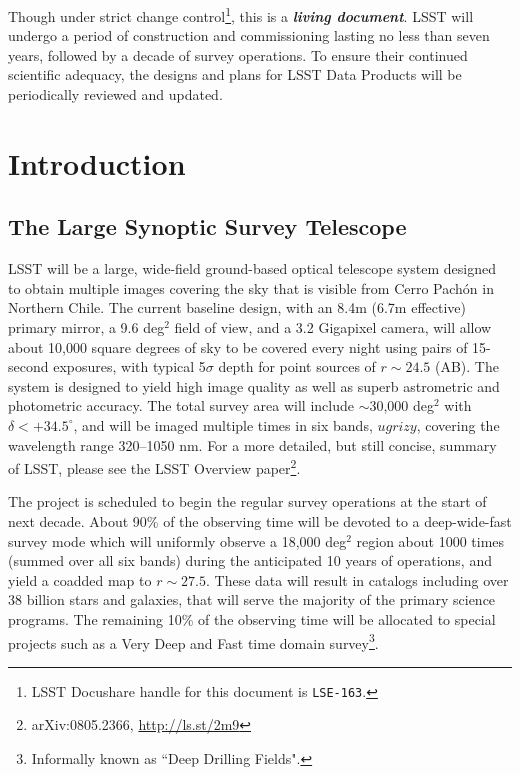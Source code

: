 \documentclass[12pt]{article}
\begin{document}
Though under strict change control\footnote{LSST Docushare handle for this document is {\tt LSE-163}.}, this is a {\bf \em living document}. LSST will undergo a period of construction  and commissioning lasting no less than seven years, followed by a decade of survey operations. To ensure their continued scientific adequacy, the designs and plans for LSST Data Products will be periodically reviewed and updated.

\clearpage

\section{Introduction}

\subsection{The Large Synoptic Survey Telescope}

LSST will be a large, wide-field ground-based optical telescope system
designed to obtain multiple images covering the sky that is visible from Cerro Pach\'{o}n in Northern Chile. The current baseline design, with an 8.4m (6.7m effective) primary mirror, a 9.6 deg$^2$ field of view, and a 3.2 Gigapixel camera, will allow about 10,000 square degrees of sky to be covered every night using pairs of 15-second exposures, with typical 5$\sigma$ depth for point sources of $r\sim24.5$ (AB). The system is designed to yield high image quality as well as superb astrometric  and photometric accuracy. The total survey area will include $\sim$30,000 deg$^2$ with $\delta<+34.5^\circ$, and will be imaged multiple times in six bands, $ugrizy$, covering the wavelength range 320--1050 nm. For a more detailed, but still concise,
summary of LSST, please see the LSST Overview paper\footnote{arXiv:0805.2366, \url{http://ls.st/2m9}}.

The project is scheduled to  begin the regular survey operations at the start of next decade. About 90\% of the observing time will be devoted to a deep-wide-fast survey mode which will uniformly observe a 18,000 deg$^2$ region about 1000 times (summed over all six bands) during the anticipated 10 years of operations, and yield a coadded map to $r\sim27.5$. These data will result in catalogs including over $38$ billion stars and galaxies, that will serve the majority of the primary science programs. The remaining 10\% of the observing time will be allocated to special projects such as a Very Deep and Fast time domain survey\footnote{Informally known as ``Deep Drilling Fields".}.
\end{document}
